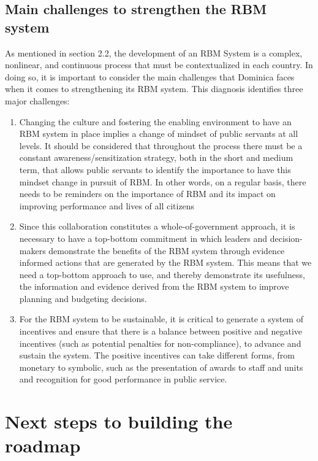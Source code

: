 \documentclass[
  10pt,
]{book}
\begin{document}
\hypertarget{main-challenges-to-strengthen-the-rbm-system}{%
\section{Main challenges to strengthen the RBM system}\label{main-challenges-to-strengthen-the-rbm-system}}

As mentioned in section 2.2, the development of an RBM System is a complex, nonlinear, and continuous process that must be contextualized in each country. In doing so, it is important to consider the main challenges that Dominica faces when it comes to strengthening its RBM system. This diagnosis identifies three major challenges:

\begin{enumerate}
\def\labelenumi{\arabic{enumi}.}
\item
  Changing the culture and fostering the enabling environment to have an RBM system in place implies a change of mindset of public servants at all levels. It should be considered that throughout the process there must be a constant awareness/sensitization strategy, both in the short and medium term, that allows public servants to identify the importance to have this mindset change in pursuit of RBM. In other words, on a regular basis, there needs to be reminders on the importance of RBM and its impact on improving performance and lives of all citizens
\item
  Since this collaboration constitutes a whole-of-government approach, it is necessary to have a top-bottom commitment in which leaders and decision-makers demonstrate the benefits of the RBM system through evidence informed actions that are generated by the RBM system. This means that we need a top-bottom approach to use, and thereby demonstrate its usefulness, the information and evidence derived from the RBM system to improve planning and budgeting decisions.
\item
  For the RBM system to be sustainable, it is critical to generate a system of incentives and ensure that there is a balance between positive and negative incentives (such as potential penalties for non-compliance), to advance and sustain the system. The positive incentives can take different forms, from monetary to symbolic, such as the presentation of awards to staff and units and recognition for good performance in public service.
\end{enumerate}

\hypertarget{section6}{%
\chapter{Next steps to building the roadmap}\label{section6}}
\end{document}
